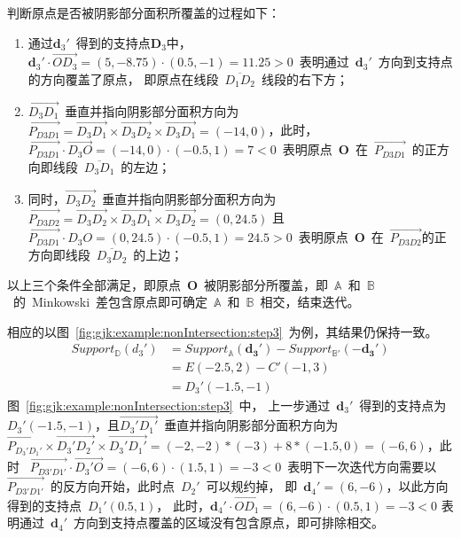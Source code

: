 判断原点是否被阴影部分面积所覆盖的过程如下：
\begin{enumerate}[(1)]
  \item 通过$\bm{d}_3'$~得到的支持点$\bm{D}_3$中，$\bm{d}_3' \cdot \overrightarrow{OD_3} = (5, -8.75) \cdot (0.5, -1) = 11.25 > 0$~表明通过~$\bm{d}_3'$~方向到支持点的方向覆盖了原点，
    即原点在线段~$\overline{D_1D_2}$~线段的右下方；
  \item $\overrightarrow{D_3D_1}$~垂直并指向阴影部分面积方向为~$\overrightarrow{P_{D3D1}}=\overrightarrow{D_3D_1} \times \overrightarrow{D_3D_2} \times \overrightarrow{D_3D_1} = (-14, 0)$，此时，
    $\overrightarrow{P_{D3D1}} \cdot \overrightarrow{D_3O} = (-14, 0) \cdot (-0.5, 1) = 7 < 0$~表明原点~$\bm{O}$~在~$\overrightarrow{P_{D3D1}}$~的正方向即线段~$\overline{D_3D_1}$~的左边；
  \item 同时，$\overrightarrow{D_3D_2}$~垂直并指向阴影部分面积方向为~$\overrightarrow{P_{D3D2}}=\overrightarrow{D_3D_2}
\times \overrightarrow{D_3D_1} \times \overrightarrow{D_3D_2} = (0, 24.5)$
且~$\overrightarrow{P_{D3D1}} \cdot D_3O = (0, 24.5) \cdot (-0.5, 1) = 24.5 > 0$~表明原点~$\bm{O}$~在~$\overrightarrow{P_{D3D2}}$的正方向即线段~$\overline{D_3D_2}$~的上边；
\end{enumerate}
以上三个条件全部满足，即原点~$\bm{O}$~被阴影部分所覆盖，即~$\mathbb{A}$~和~$\mathbb{B}$~的~Minkowski~差包含原点即可确定~$\mathbb{A}$~和~$\mathbb{B}$~相交，结束迭代。

相应的以图~\ref{fig:gjk:example:nonIntersection:step3}~为例，其结果仍保持一致。
\begin{equation}
  \begin{array}{ll}
  Support_\mathbb{D}(d_3')  & = Support_\mathbb{A}(\bm{d_3'}) - Support_\mathbb{B'}(-\bm{d_3'}) \\
    & = E(-2.5, 2) - C'(-1, 3) \\
    & = D_3'(-1.5, -1) 
  \end{array}
\end{equation}
图~\ref{fig:gjk:example:nonIntersection:step3}~中，
上一步通过~$\bm{d}_3'$~得到的支持点为~$D_3'(-1.5, -1)$，且$\overrightarrow{D_3'D_1'}$~垂直并指向阴影部分面积方向为~$\overrightarrow{P_{D_3'D_1'}}
\times \overrightarrow{D_3'D_2'} \times \overrightarrow{D_3'D_1'} =
(-2,-2)*(-3) + 8*(-1.5, 0) = (-6, 6)$，此时
~$\overrightarrow{P_{D3'D1'}} \cdot \overrightarrow{D_3'O} = (-6, 6) \cdot (1.5, 1) = -3 < 0$~表明下一次迭代方向需要以~$\overrightarrow{P_{D3'D1'}}$~的反方向开始，此时点~$D_2'$~可以规约掉，
即~$\bm{d}_4'= (6, -6)$，以此方向得到的支持点~$D_1'(0.5, 1)$，
此时，$\bm{d}_4' \cdot \overrightarrow{OD_1} = (6, -6) \cdot (0.5, 1) = -3 < 0 $ 表明通过~$\bm{d}_4'$~方向到支持点覆盖的区域没有包含原点，即可排除相交。

